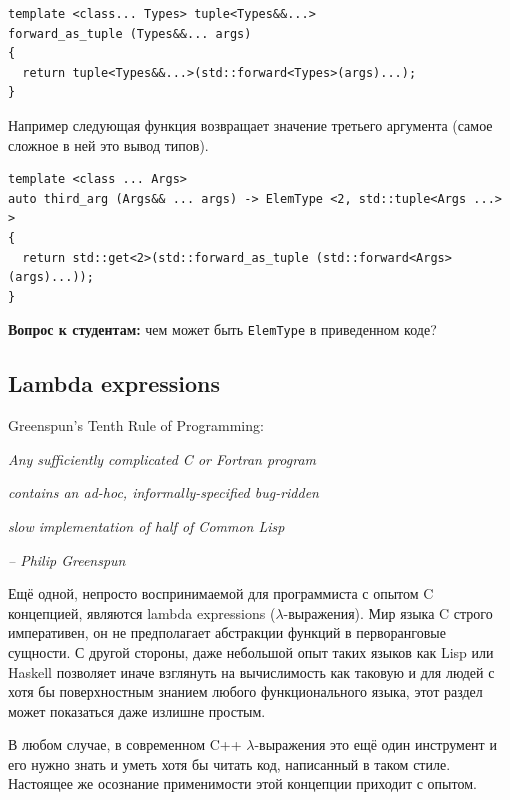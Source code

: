 \documentclass[a4paper,12pt,oneside]{article}
\newif\ifanswers
\begin{document}
\begin{lstlisting}
template <class... Types> tuple<Types&&...> 
forward_as_tuple (Types&&... args)
{
  return tuple<Types&&...>(std::forward<Types>(args)...);
} 
\end{lstlisting}

Например следующая функция возвращает значение третьего аргумента (самое сложное в ней это вывод типов).

\begin{lstlisting}
template <class ... Args>
auto third_arg (Args&& ... args) -> ElemType <2, std::tuple<Args ...> >
{
  return std::get<2>(std::forward_as_tuple (std::forward<Args>(args)...));
}
\end{lstlisting}

\textbf{Вопрос к студентам:} чем может быть \lstinline!ElemType! в приведенном коде?

\ifanswers
\lstinline!ElemType! это просто удобный синоним для сложного decltype:

\begin{lstlisting}
template <size_t i, class T>
using ElemType = decltype (std::get<i>(std::declval<T>()));
\end{lstlisting}
\fi

\pagebreak
\subsection{Lambda expressions}\label{LambdaExpressions}

\hfill{Greenspun's Tenth Rule of Programming:}

\hfill\textit{Any sufficiently complicated C or Fortran program}

\hfill\textit{contains an ad-hoc, informally-specified bug-ridden}

\hfill\textit{slow implementation of half of Common Lisp}{\vspace{0.5em}}

\hfill\textit{-- Philip Greenspun}

Ещё одной, непросто воспринимаемой для программиста с опытом C концепцией, являются lambda expressions ($\lambda$-выражения). Мир языка C строго императивен, он не предполагает абстракции функций в перворанговые сущности. С другой стороны, даже небольшой опыт таких языков как Lisp или Haskell позволяет иначе взглянуть на вычислимость как таковую и для людей с хотя бы поверхностным знанием любого функционального языка, этот раздел может показаться даже излишне простым.

В любом случае, в современном C++ $\lambda$-выражения это ещё один инструмент и его нужно знать и уметь хотя бы читать код, написанный в таком стиле. Настоящее же осознание применимости этой концепции приходит с опытом. 
\end{document}
